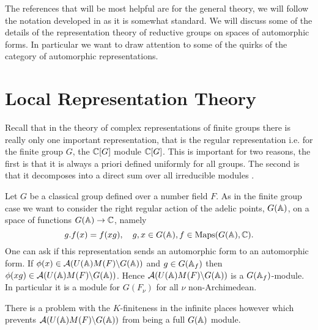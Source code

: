 The references that will be most helpful are \cite[I.II]{borelAutomorphicFormsRepresentations1979}\cite{getzIntroductionAutomorphicRepresentations2024} for the general theory, we will follow the notation developed in \cite{moeglinSpectralDecompositionEisenstein1995} as it is somewhat standard. We will discuss some of the details of the representation theory of reductive groups on spaces of automorphic forms. In particular we want to draw attention to some of the quirks of the category of automorphic representations. 

\section{Local Representation Theory}
Recall that in the theory of complex representations of finite groups there is really only one important representation, that is the regular representation i.e. for the finite group \(G\), the \(\C[G]\) module \(\C[G]\). This is important for two reasons, the first is that it is always a priori defined uniformly for all groups. The second is that it decomposes into a direct sum over all irreducible modules \cite[Ch. 2.4 Cor. 2 ]{serreLinearRepresentationsFinite1996}.

Let \(G\) be a classical group defined over a number field \(F\). 
As in the finite group case we want to consider the right regular action of the adelic points, \(G(\A)\), on a space of functions \(G(\A) \to \C\), namely
\[g.f(x) = f(xg), \quad g,x\in G(\A), f\in \mathrm{Maps}(G(\A), \C).\]
One can ask if this representation sends an automorphic form to an automorphic form.
If \(\phi(x)\in \mathcal{A}(U(\A)M(F)\backslash G(\A))\) and \(g\in G(\A_f)\) then \(\phi(xg) \in \mathcal{A}(U(\A)M(F)\backslash G(\A)) \). Hence \(\mathcal{A}(U(\A)M(F)\backslash G(\A))\) is a \(G(\A_f)\)-module. In particular it is a module for \(G(F_\nu)\) for all \(\nu\) non-Archimedean.

There is a problem with the \(K\)-finiteness in the infinite places however which prevents \( \mathcal{A}(U(\A)M(F)\backslash G(\A))\) from being a full \(G(\A)\) module.

